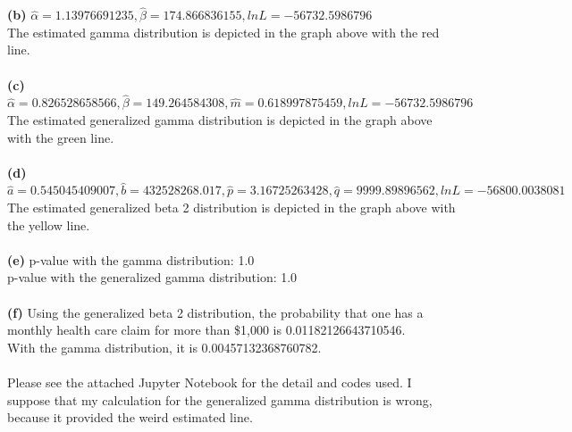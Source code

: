 \documentclass[letterpaper,12pt]{article}
\theoremstyle{definition}
\begin{document}
\textbf{(b)} $\hat{\alpha}= 1.13976691235,  \hat{\beta}= 174.866836155, lnL= -56732.5986796$ \\ 
The estimated gamma distribution is depicted in the graph above with the red line. \\ \\
\textbf{(c)} $\hat{\alpha}= 0.826528658566,  \hat{\beta}= 149.264584308, \hat{m}= 0.618997875459, lnL= -56732.5986796$ \\
The estimated generalized gamma distribution is depicted in the graph above with the green line. \\ \\
\textbf{(d)} $\hat{a}= 0.545045409007,  \hat{b}= 432528268.017, \hat{p}= 3.16725263428, \hat{q}= 9999.89896562, lnL= -56800.0038081$ \\
The estimated generalized beta 2 distribution is depicted in the graph above with the yellow line. \\ \\
\textbf{(e)} p-value with the gamma distribution: 1.0 \\ p-value with the generalized gamma distribution: 1.0 \\ \\
\textbf{(f)} Using the generalized beta 2 distribution, the probability that one has a monthly health care claim for more than \$1,000 is 0.01182126643710546. \\ With the gamma distribution, it is 0.00457132368760782. \\ \\
Please see the attached Jupyter Notebook for the detail and codes used. I suppose that my calculation for the generalized gamma distribution is wrong, because it provided the weird estimated line. \\ \\
\end{document}
